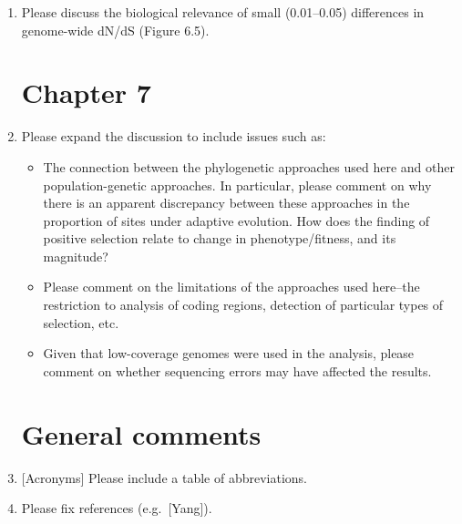 \begin{enumerate}
\item{ Please discuss the
  biological relevance of small (0.01--0.05) differences in
  genome-wide dN/dS (Figure 6.5).

}

\section{Chapter 7}

\item{Please expand the discussion to include issues such as:
  \begin{itemize}
  \item{ The connection between the phylogenetic approaches used
    here and other population-genetic approaches. In particular,
    please comment on why there is an apparent discrepancy between
    these approaches in the proportion of sites under adaptive
    evolution. How does the finding of positive selection relate to
    change in phenotype/fitness, and its magnitude?

  }
  \item{ Please comment on the limitations of the approaches used
    here--the restriction to analysis of coding regions, detection of
    particular types of selection, etc.

  }
  \item{ Given that low-coverage genomes were used in the analysis,
    please comment on whether sequencing errors may have affected the
    results.

  }
  \end{itemize}
}

\section{General comments}

\item{[Acronyms] Please include a table of abbreviations.

}

\item{Please fix references (e.g.\ [Yang]).

}
\end{enumerate}
